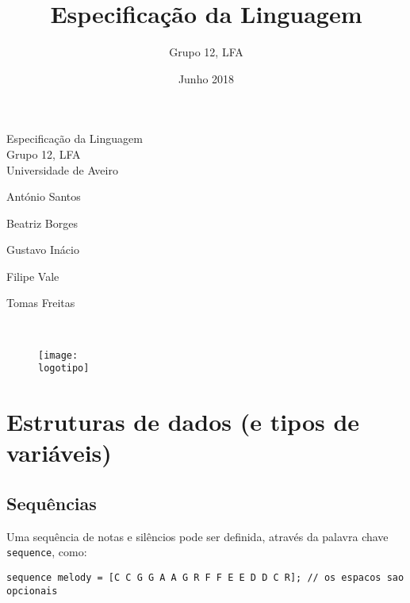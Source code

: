 \documentclass{article}
\title{Especificação da Linguagem}
\author{Grupo 12, LFA}
\date{Junho 2018}
\begin{document}
\def\titulo{Especificação da Linguagem}
\def\grupo{Grupo 12, LFA}
\def\empresa{Universidade de Aveiro}
\def\autores{António Santos\par Beatriz Borges\par \par Gustavo Inácio\par Filipe Vale\par Tomas Freitas}
\def\logotipo{ua.pdf}

\begin{titlepage}
\begin{center}
%
\vspace*{40mm}
%
{\Huge \titulo}\\ 
%
\vspace{8mm}
%
{\Large \grupo}\\
%
\vspace{2mm}
%
{\Large \empresa}\\
%
\vspace{10mm}
%
{\LARGE \autores}\\ 
%
\vspace{30mm}
%
\begin{figure}[h]
\center
\texttt{[image: \\logotipo]}
\end{figure}
%
\vspace{30mm}
\end{center}
\end{titlepage}



\maketitle

\tableofcontents
\clearpage

\section{Estruturas de dados (e tipos de variáveis)} \label{variables}
\subsection{Sequências}
Uma sequência de notas e silêncios pode ser definida, através da palavra chave \texttt{sequence}, como:
\begin{lstlisting} 
sequence melody = [C C G G A A G R F F E E D D C R]; // os espacos sao opcionais
\end{lstlisting}
\end{document}
